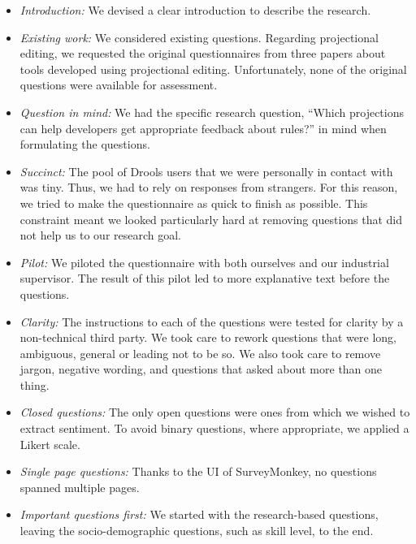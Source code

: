 \begin{itemize}    
    \setlength\itemsep{0em}
    \item \emph{Introduction:} 
        We devised a clear introduction to describe the research.
    \item \emph{Existing work:} 
        We considered existing questions.
        Regarding projectional editing, we requested the original questionnaires from three papers\cite{meacham2020adaptivevle_SLR,berger2016efficiency, voelter2014towards} about tools developed using projectional editing.
        Unfortunately, none of the original questions were available for assessment.
    \item \emph{Question in mind:} 
        We had the specific research question, ``Which projections can help developers get appropriate feedback about rules?'' in mind when formulating the questions.
    \item \emph{Succinct:} 
        The pool of Drools users that we were personally in contact with was tiny.
        Thus, we had to rely on responses from strangers.
        For this reason, we tried to make the questionnaire as quick to finish as possible.
        This constraint meant we looked particularly hard at removing questions that did not help us to our research goal.
    \item \emph{Pilot:} 
        We piloted the questionnaire with both ourselves and our industrial supervisor. 
        The result of this pilot led to more explanative text before the questions.
    \item \emph{Clarity:} 
        The instructions to each of the questions were tested for clarity by a non-technical third party.
        We took care to rework questions that were long, ambiguous, general or leading not to be so.
        We also took care to remove jargon, negative wording, and questions that asked about more than one thing.
    \item \emph{Closed questions:} 
        The only open questions were ones from which we wished to extract sentiment.
        To avoid binary questions, where appropriate, we applied a Likert scale\cite{likert1932technique}.
    \item \emph{Single page questions:} 
        Thanks to the UI of SurveyMonkey, no questions spanned multiple pages.
    \item \emph{Important questions first:} 
        We started with the research-based questions, leaving the socio-demographic questions, such as skill level, to the end.
\end{itemize}

